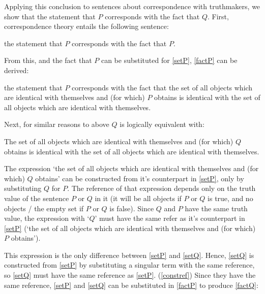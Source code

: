 Applying this conclusion to sentences about correspondence with truthmakers, we show that the statement that $P$ corresponds with the fact that $Q$.
First, correspondence theory entails the following sentence:

	\begin{example} \label{stateP}
	the statement that $P$ corresponds with the fact that $P$.
	\end{example}

From this, and the fact that $P$ can be substituted for \ref{setP}, \ref{factP} can be derived:

	\begin{example} \label{factP}
	the statement that $P$ corresponds with the fact that the set of all objects which are identical with themselves and (for which) $P$ obtains is identical with the set of all objects which are identical with themselves.
	\end{example}

Next, for similar reasons to above $Q$ is logically equivalent with:

	\begin{example} \label{setQ}
	The set of all objects which are identical with themselves and (for which) $Q$ obtains is identical with the set of all objects which are identical with themselves.
	\end{example}

The expression `the set of all objects which are identical with themselves and (for which) $Q$ obtains' can be constructed from it's counterpart in \ref{setP}, only by substituting $Q$ for $P$.
The reference of that expression depends only on the truth value of the sentence $P$ or $Q$ in it (it will be all objects if $P$ or $Q$ is true, and no objects / the empty set if $P$ or $Q$ is false).
Since $Q$ and $P$ have the same truth value, the expression with `$Q$' must have the same refer as it's counterpart in \ref{setP} (`the set of all objects which are identical with themselves and (for which) $P$ obtains').

This expression is the only difference between \ref{setP} and \ref{setQ}.
Hence, \ref{setQ} is constructed from \ref{setP} by substituting a singular term with the same reference, so \ref{setQ} must have the same reference as \ref{setP}. (\ref{constref})
Since they have the same reference, \ref{setP} and \ref{setQ} can be substituted in \ref{factP} to produce \ref{factQ}:

